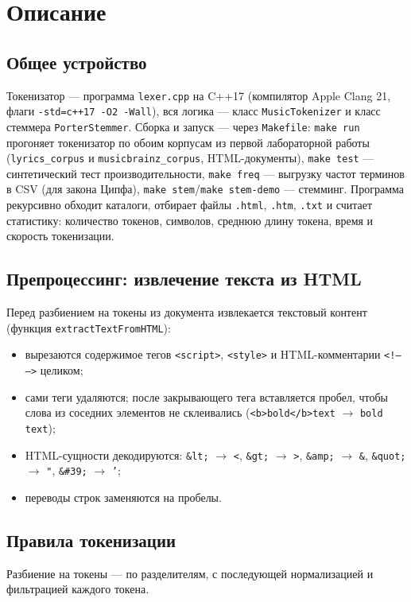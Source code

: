 \section{Описание}

\subsection{Общее устройство}
Токенизатор --- программа \texttt{lexer.cpp} на C++17 (компилятор Apple Clang
21, флаги \texttt{-std=c++17 -O2 -Wall}), вся логика --- класс
\texttt{MusicTokenizer} и класс стеммера \texttt{PorterStemmer}. Сборка и
запуск --- через \texttt{Makefile}: \texttt{make run} прогоняет токенизатор по
обоим корпусам из первой лабораторной работы (\texttt{lyrics\_corpus} и
\texttt{musicbrainz\_corpus}, HTML-документы), \texttt{make test} ---
синтетический тест производительности, \texttt{make freq} --- выгрузку частот
терминов в CSV (для закона Ципфа), \texttt{make stem}/\texttt{make stem-demo}
--- стемминг. Программа рекурсивно обходит каталоги, отбирает файлы
\texttt{.html}, \texttt{.htm}, \texttt{.txt} и считает статистику: количество
токенов, символов, среднюю длину токена, время и скорость токенизации.

\subsection{Препроцессинг: извлечение текста из HTML}
Перед разбиением на токены из документа извлекается текстовый контент
(функция \texttt{extractTextFromHTML}):

\begin{itemize}
    \item вырезаются содержимое тегов \texttt{<script>}, \texttt{<style>} и
    HTML-комментарии \texttt{<!-- -->} целиком;
    \item сами теги удаляются; после закрывающего тега вставляется пробел,
    чтобы слова из соседних элементов не склеивались (\texttt{<b>bold</b>text}
    $\to$ \texttt{bold text});
    \item HTML-сущности декодируются: \texttt{\&lt;} $\to$ \texttt{<},
    \texttt{\&gt;} $\to$ \texttt{>}, \texttt{\&amp;} $\to$ \texttt{\&},
    \texttt{\&quot;} $\to$ \texttt{"}, \texttt{\&\#39;} $\to$ \texttt{'};
    \item переводы строк заменяются на пробелы.
\end{itemize}

\subsection{Правила токенизации}
Разбиение на токены --- по разделителям, с последующей нормализацией и
фильтрацией каждого токена.

